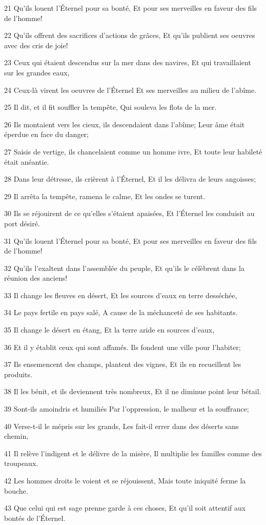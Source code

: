 \par 21 Qu'ils louent l'Éternel pour sa bonté, Et pour ses merveilles en faveur des fils de l'homme!
\par 22 Qu'ils offrent des sacrifices d'actions de grâces, Et qu'ils publient ses oeuvres avec des cris de joie!
\par 23 Ceux qui étaient descendus sur la mer dans des navires, Et qui travaillaient sur les grandes eaux,
\par 24 Ceux-là virent les oeuvres de l'Éternel Et ses merveilles au milieu de l'abîme.
\par 25 Il dit, et il fit souffler la tempête, Qui souleva les flots de la mer.
\par 26 Ils montaient vers les cieux, ils descendaient dans l'abîme; Leur âme était éperdue en face du danger;
\par 27 Saisis de vertige, ils chancelaient comme un homme ivre, Et toute leur habileté était anéantie.
\par 28 Dans leur détresse, ils crièrent à l'Éternel, Et il les délivra de leurs angoisses;
\par 29 Il arrêta la tempête, ramena le calme, Et les ondes se turent.
\par 30 Ils se réjouirent de ce qu'elles s'étaient apaisées, Et l'Éternel les conduisit au port désiré.
\par 31 Qu'ils louent l'Éternel pour sa bonté, Et pour ses merveilles en faveur des fils de l'homme!
\par 32 Qu'ils l'exaltent dans l'assemblée du peuple, Et qu'ils le célèbrent dans la réunion des anciens!
\par 33 Il change les fleuves en désert, Et les sources d'eaux en terre desséchée,
\par 34 Le pays fertile en pays salé, A cause de la méchanceté de ses habitants.
\par 35 Il change le désert en étang, Et la terre aride en sources d'eaux,
\par 36 Et il y établit ceux qui sont affamés. Ils fondent une ville pour l'habiter;
\par 37 Ils ensemencent des champs, plantent des vignes, Et ils en recueillent les produits.
\par 38 Il les bénit, et ils deviennent très nombreux, Et il ne diminue point leur bétail.
\par 39 Sont-ils amoindris et humiliés Par l'oppression, le malheur et la souffrance;
\par 40 Verse-t-il le mépris sur les grands, Les fait-il errer dans des déserts sans chemin,
\par 41 Il relève l'indigent et le délivre de la misère, Il multiplie les familles comme des troupeaux.
\par 42 Les hommes droits le voient et se réjouissent, Mais toute iniquité ferme la bouche.
\par 43 Que celui qui est sage prenne garde à ces choses, Et qu'il soit attentif aux bontés de l'Éternel.

